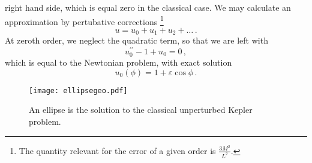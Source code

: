 right hand side, which is equal zero in the classical case.
We may calculate an approximation by pertubative corrections
\footnote{The quantity relevant for the error of a given order is
$\frac{3M^2}{L^2}$.}
\begin{equation}
u=u_0+u_1+u_2+\dots\,.
\end{equation}
At zeroth order, we neglect the quadratic term, so that we are left with
\begin{equation}
u_0^{\prime\prime}-1+u_0=0\,,
\end{equation}
which is equal to the Newtonian problem, with exact solution
\begin{equation}
u_0(\phi)=1+\varepsilon\cos\phi\,.
\end{equation}
\begin{figure}[hbtp!]
\centering
 \texttt{[image: ellipsegeo.pdf]}
\caption{An ellipse is the solution to the classical unperturbed Kepler
problem.}
\end{figure}

